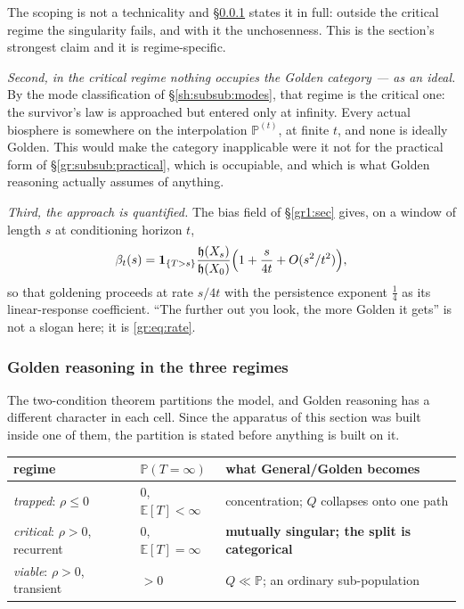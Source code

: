 \documentclass[11pt]{article}
\numberwithin{equation}{section}
\theoremstyle{plain}
\theoremstyle{definition}
\theoremstyle{remark}
\newcommand{\E}{\mathbb{E}}
\newcommand{\PP}{\mathbb{P}}
\newcommand{\one}{\mathbf{1}}
\newcommand{\hm}{\mathfrak{h}}
\begin{document}
The scoping is not a technicality and \S\ref{gr:subsub:regimes} states
it in full: outside the critical regime the singularity fails, and with
it the unchosenness. This is the section's strongest claim and it is
regime-specific.

\emph{Second, in the critical regime nothing occupies the Golden
category --- as an ideal.} By the mode classification of
\S\ref{sh:subsub:modes}, that regime is the critical one: the survivor's
law is approached but entered only at infinity. Every actual biosphere is somewhere on the interpolation
$\PP^{(t)}$, at finite $t$, and none is ideally Golden. This would make
the category inapplicable were it not for the practical form of
\S\ref{gr:subsub:practical}, which is occupiable, and which is what
Golden reasoning actually assumes of anything.

\emph{Third, the approach is quantified.} The bias field of \S\ref{gr1:sec}
gives, on a window of length $s$ at conditioning horizon $t$,
\begin{equation}\label{gr:eq:rate}
\beta_t(s)=\one_{\{T>s\}}\frac{\hm(X_s)}{\hm(X_0)}
\Bigl(1+\frac{s}{4t}+O(s^{2}/t^{2})\Bigr),
\end{equation}
so that goldening proceeds at rate $s/4t$ with the persistence exponent
$\tfrac14$ as its linear-response coefficient. ``The further out you
look, the more Golden it gets'' is not a slogan here; it is
\eqref{gr:eq:rate}.

\subsubsection{Golden reasoning in the three regimes}
\label{gr:subsub:regimes}

The two-condition theorem partitions the model, and Golden reasoning has
a different character in each cell. Since the apparatus of this section
was built inside one of them, the partition is stated before anything is
built on it.

\begin{center}\small
\begin{tabular}{@{}lll@{}}
\toprule
regime & $\PP(T=\infty)$ & what General/Golden becomes\\
\midrule
\emph{trapped}: $\rho\le0$ & $0$, $\E[T]<\infty$ &
concentration; $Q$ collapses onto one path\\
\emph{critical}: $\rho>0$, recurrent & $0$, $\E[T]=\infty$ &
\textbf{mutually singular; the split is categorical}\\
\emph{viable}: $\rho>0$, transient & $>0$ &
$Q\ll\PP$; an ordinary sub-population\\
\bottomrule
\end{tabular}
\end{center}
\end{document}
